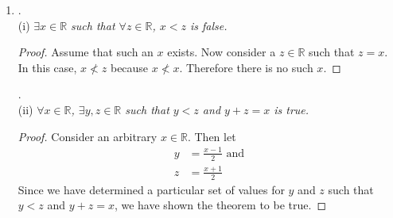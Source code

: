 \documentclass{amsart}
\begin{document}
\begin{enumerate}[1.]
\begin{proof}
Assume, for contradiction, that $|a - b| < \epsilon$ for all $\epsilon > 0$
and $a$ and $b$ are not equal. Then
\begin{align*}
    a &= b + c \text{ where $c\in\mathbb{R}$ and $c\neq 0$} \\
    a + (-b) &= (b + c) + (-b) \\
    a + (-b) &= b + (c + (-b)) &\text{ by associativity. } \\
    a + (-b) &= b + ((-b) + c) &\text{ by commutativity. } \\
    a + (-b) &= (b + (-b)) + c &\text{ by associativity. } \\ 
    a + (-b) &= 0 + c &\text{ by additive inverse. } \\
    a - b &= c &\text{ by additive identity. } \\
    |a - b| &= |c| \\
    |a - b| &= d \text{ where $d\in\mathbb{R^+}$ by definition
    of absolute value (and the fact that $c\neq 0$).}
\end{align*}
Now consider $\epsilon = d/2$. We know that $\epsilon > 0$ because 
$d\in\mathbb{R^+}$ and $\mathbb{R^+}$ is closed under division.
But
\begin{align*}
    \frac{d}{2} < d \text{ as $\mathbb{R^+}$ is ordered. } \\
    \text{So } |a - b| = d \nless \frac{d}{2} = \epsilon.  \\
    \text{Thus } |a - b| \nless\epsilon \text{ for some $\epsilon > 0$.}
\end{align*}
This is a contradiction! Therefore $a$ and $b$ must be equal.
\end{proof}

\newpage


\item .\\
(i)\emph{ $\exists x\in\mathbb{R}$ such that $\forall z\in\mathbb{R}$, $x < z$ is false.}
\begin{proof}
Assume that such an $x$ exists. Now consider a $z\in\mathbb{R}$
such that $z = x$. In this case, $x \nless z$ because $ x \nless x$. 
Therefore there is no such $x$.
\end{proof}
.\\
(ii)\emph{ $\forall x\in\mathbb{R}$, $\exists y,z \in\mathbb{R}$ such that $y < z$ and $y+z = x$ is true.}
\begin{proof}
Consider an arbitrary $x\in\mathbb{R}$. Then let
\begin{align*}
    y &= \frac{x-1}{2}  \text{ and}\\
    z &= \frac{x+1}{2}
\end{align*}
Since we have determined a particular set of values for 
$y$ and $z$ such that $y < z$ and $y+z = x$, we have shown 
the theorem to be true.
\end{proof}


\end{enumerate}
\end{document}
